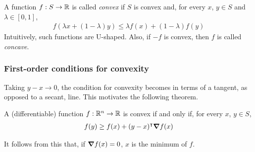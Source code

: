 \documentclass{../template/note}
\begin{document}
    \begin{definition}
        A function $f: S \to \mathbb R$ is called \emph{convex} if $S$ is convex and, for every $x$, $y \in S$ and $\lambda \in [0, 1]$,
        \begin{align*}
            f(\lambda x + (1-\lambda)y) \leq \lambda f(x) + (1-\lambda)f(y)
        \end{align*}
        Intuitively, such functions are U-shaped. Also, if $-f$ is convex, then $f$ is called \emph{concave}.
    \end{definition}
    
    \subsubsection{First-order conditions for convexity}

    Taking $y-x \to 0$, the condition for convexity becomes in terms of a tangent, as opposed to a secant, line. This motivates the following theorem.

    \begin{theorem}
        A (differentiable) function $f: \mathbb R^n \to \mathbb R$ is convex if and only if, for every $x$, $y \in S$,
        \begin{align*}
            f(y) \geq f(x) + (y-x)^\intercal \grad f(x)
        \end{align*}
    \end{theorem}

    \begin{remark*}
        It follows from this that, if $\grad f(x) = 0$, $x$ is the minimum of $f$.
    \end{remark*}
    
\end{document}
